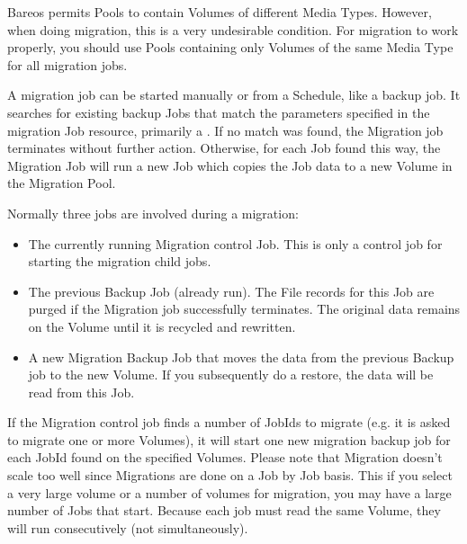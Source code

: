 Bareos permits Pools to contain Volumes of different Media Types.
However, when doing migration, this is a very undesirable condition.  For
migration to work properly, you should use Pools containing only Volumes of
the same Media Type for all migration jobs.

A migration job can be started manually or from a Schedule, like
a backup job. It searches for existing backup Jobs that match the
parameters specified in the migration Job resource, primarily a
. If no match was
found, the Migration job terminates without further action. Otherwise,
for each Job found this way, the Migration Job will run a new Job
which copies the Job data to a new Volume in the Migration Pool.

Normally three jobs are involved during a migration:

\begin{itemize}
\item The currently running Migration control Job. This is only
      a control job for starting the migration child jobs.
\item The previous Backup Job (already run). The File records
      for this Job are purged if the Migration job successfully
      terminates.  The original data remains on the Volume until
      it is recycled and rewritten.
\item A new Migration Backup Job that moves the data from the
      previous Backup job to the new Volume.  If you subsequently
      do a restore, the data will be read from this Job.
\end{itemize}

If the Migration control job finds a number of JobIds to migrate (e.g.
it is asked to migrate one or more Volumes), it will start one new
migration backup job for each JobId found on the specified Volumes.
Please note that Migration doesn't scale too well since Migrations are
done on a Job by Job basis. This if you select a very large volume or
a number of volumes for migration, you may have a large number of
Jobs that start. Because each job must read the same Volume, they will
run consecutively (not simultaneously).



